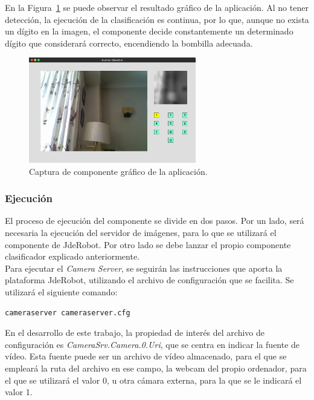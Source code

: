 En la Figura~\ref{fig.gui} se puede observar el resultado gráfico de la aplicación. Al no tener detección, la ejecución de la clasificación es continua, por lo que, aunque no exista un dígito en la imagen, el componente decide constantemente un determinado dígito que considerará correcto, encendiendo la bombilla adecuada.

\begin{figure}[H]
	\begin{center}
		\includegraphics[width=0.65\textwidth]{figures/gui}
		\caption{Captura de componente gráfico de la aplicación.}
		\label{fig.gui}
	\end{center}
\end{figure}

\subsubsection{Ejecución}
El proceso de ejecución del componente se divide en dos pasos. Por un lado, será necesaria la ejecución del servidor de imágenes, para lo que se utilizará el componente de JdeRobot. Por otro lado se debe lanzar el propio componente clasificador explicado anteriormente.\\

Para ejecutar el \textit{Camera Server}, se seguirán las instrucciones que aporta la plataforma JdeRobot, utilizando el archivo de configuración que se facilita. Se utilizará el siguiente comando: 
\vspace{10pt}
\begin{lstlisting}[frame=single]
	cameraserver cameraserver.cfg
\end{lstlisting}

En el desarrollo de este trabajo, la propiedad de interés del archivo de configuración es \textit{CameraSrv.Camera.0.Uri}, que se centra en indicar la fuente de vídeo. Esta fuente puede ser un archivo de vídeo almacenado, para el que se empleará la ruta del archivo en ese campo, la webcam del propio ordenador, para el que se utilizará el valor 0, u otra cámara externa, para la que se le indicará el valor 1.\\

